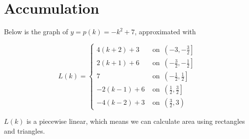 \documentclass{ximera}
\begin{document}
\section{Accumulation}



Below is the graph of $y = p(k) = -k^2 + 7$, approximated with

\[
L(k) = 
\begin{cases}
  4(k+2)+3       &          \text{ on } \,     \left(-3, -\frac{3}{2}\right]   \\
  2(k+1)+6       &          \text{ on } \,     \left(-\frac{3}{2}, -\frac{1}{2}\right]   \\
  7              &          \text{ on } \,     \left(-\frac{1}{2}, \frac{1}{2}\right]   \\
  -2(k-1)+6      &          \text{ on } \,     \left(\frac{1}{2}, \frac{3}{2}\right]   \\
  -4(k-2)+3      &          \text{ on } \,     \left(\frac{3}{2}, 3\right)   
\end{cases}
\]


$L(k)$ is a piecewise linear, which means we can calculate area using rectangles and triangles.
\end{document}
